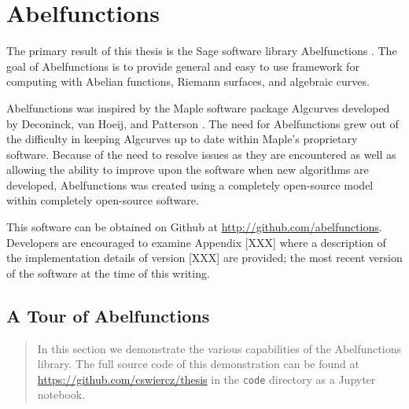 \chapter{Abelfunctions}

The primary result of this thesis is the Sage software library Abelfunctions
\cite{abelfunctions}. The goal of Abelfunctions is to provide general and easy
to use framework for computing with Abelian functions, Riemann surfaces, and
algebraic curves.

Abelfunctions was inspired by the Maple software package Algcurves developed by
Deconinck, van Hoeij, and Patterson \cite{algcurves}. The need for Abelfunctions
grew out of the difficulty in keeping Algcurves up to date within Maple's
proprietary software. Because of the need to resolve issues as they are
encountered as well as allowing the ability to improve upon the software when
new algorithms are developed, Abelfunctions was created using a completely
open-source model within completely open-source software.

This software can be obtained on Github at
\url{http://github.com/abelfunctions}. Developers are encouraged to examine
Appendix [XXX] where a description of the implementation details of version
[XXX] are provided; the most recent version of the software at the time of this
writing.

\section{A Tour of
  Abelfunctions}\label{sec:abelfunctions-a-tour-of-abelfunctions}

\begin{quote}
  In this section we demonstrate the various capabilities of the Abelfunctions
  library. The full source code of this demonstration can be found at
  \url{https://github.com/cswiercz/thesis} in the {\tt code} directory as a
  Jupyter notebook.
\end{quote}

